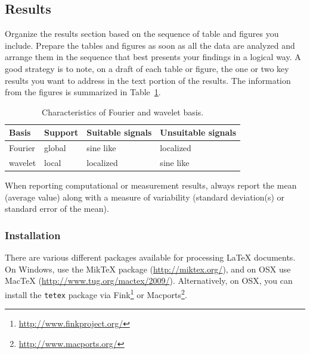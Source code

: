 \documentclass[10pt,conference,compsocconf]{IEEEtran}
\begin{document}
\subsection{Results}

Organize the results section based on the sequence of table and
figures you include. Prepare the tables and figures as soon as all
the data are analyzed and arrange them in the sequence that best
presents your findings in a logical way. A good strategy is to note,
on a draft of each table or figure, the one or two key results you
want to address in the text portion of the results.
The information from the figures is
summarized in Table~\ref{tab:fourier-wavelet}.

\begin{table}[htbp]
  \centering
  \begin{tabular}[c]{|l||l|l|l|}
    \hline
    Basis&Support&Suitable signals&Unsuitable signals\\
    \hline
    Fourier&global&sine like&localized\\
    wavelet&local&localized&sine like\\
    \hline
  \end{tabular}
  \caption{Characteristics of Fourier and wavelet basis.}
  \label{tab:fourier-wavelet}
\end{table}

When reporting computational or measurement results, always
report the mean (average value) along with a measure of variability
(standard deviation(s) or standard error of the mean).

\subsubsection{Installation}

There are various different packages available for processing \LaTeX{}
documents.
On Windows, use the Mik\TeX{} package (\url{http://miktex.org/}), and
on OSX use MacTeX
(\url{http://www.tug.org/mactex/2009/}). Alternatively, on OSX, you
can install the \texttt{tetex} package via
Fink\footnote{\url{http://www.finkproject.org/}} or 
Macports\footnote{\url{http://www.macports.org/}}.
\end{document}
